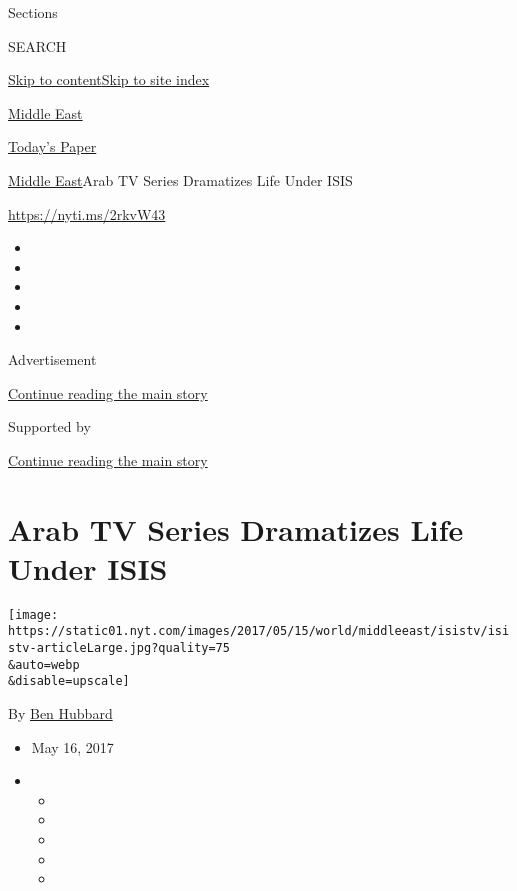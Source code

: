 Sections

SEARCH

\protect\hyperlink{site-content}{Skip to
content}\protect\hyperlink{site-index}{Skip to site index}

\href{https://www.nytimes.com/section/world/middleeast}{Middle East}

\href{https://myaccount.nytimes.com/auth/login?response_type=cookie\&client_id=vi}{}

\href{https://www.nytimes.com/section/todayspaper}{Today's Paper}

\href{/section/world/middleeast}{Middle East}\textbar{}Arab TV Series
Dramatizes Life Under ISIS

\url{https://nyti.ms/2rkvW43}

\begin{itemize}
\item
\item
\item
\item
\item
\end{itemize}

Advertisement

\protect\hyperlink{after-top}{Continue reading the main story}

Supported by

\protect\hyperlink{after-sponsor}{Continue reading the main story}

\hypertarget{arab-tv-series-dramatizes-life-under-isis}{%
\section{Arab TV Series Dramatizes Life Under
ISIS}\label{arab-tv-series-dramatizes-life-under-isis}}

\texttt{[image: https://static01.nyt.com/images/2017/05/15/world/middleeast/isistv/isistv-articleLarge.jpg?quality=75\\\&auto=webp\\\&disable=upscale]}

By \href{http://www.nytimes.com/by/ben-hubbard}{Ben Hubbard}

\begin{itemize}
\item
  May 16, 2017
\item
  \begin{itemize}
  \item
  \item
  \item
  \item
  \item
  \end{itemize}
\end{itemize}


